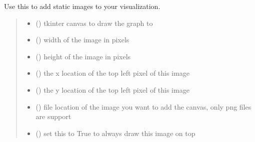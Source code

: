 \documentclass[letterpaper,10pt,english]{sphinxmanual}
\begin{document}
\begin{fulllineitems}
\sphinxAtStartPar
Use this to add static images to your visualization.
\begin{quote}\begin{description}
\begin{itemize}
\item {} 
\sphinxAtStartPar
{} () \textendash{} tkinter canvas to draw the graph to

\item {} 
\sphinxAtStartPar
{} () \textendash{} width of the image in pixels

\item {} 
\sphinxAtStartPar
{} () \textendash{} height of the image in pixels

\item {} 
\sphinxAtStartPar
{} () \textendash{} the x location of the top left pixel of this image

\item {} 
\sphinxAtStartPar
{} () \textendash{} the y location of the top left pixel of this image

\item {} 
\sphinxAtStartPar
{} () \textendash{} file location of the image you want to add the canvas, only png files are support

\item {} 
\sphinxAtStartPar
{} () \textendash{} set this to True to always draw this image on top

\end{itemize}

\end{description}\end{quote}

\begin{fulllineitems}
\label{\detokenize{index:sjvisualizer.StaticImage.static_image.draw}}
\pysigstartsignatures
{}
\pysigstopsignatures
\end{fulllineitems}


\end{fulllineitems}
\end{document}
